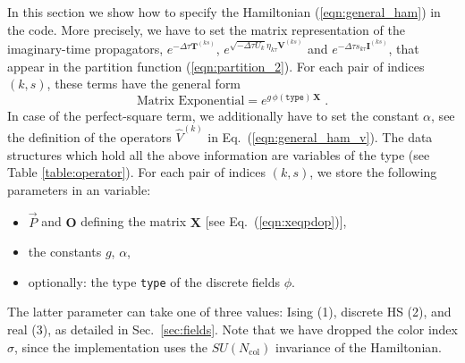 %
In this section we show how to specify the  Hamiltonian (\ref{eqn:general_ham}) in the code. 
More precisely, we have to set the matrix representation of the imaginary-time propagators,
$ e^{-\Delta \tau {\bm T}^{(ks)}}$, $e^{  \sqrt{- \Delta \tau  U_k} \eta_{k\tau} {\bm V}^{(ks)} }$ and $e^{  -\Delta \tau s_{k\tau}  {\bm I}^{(ks)}}$, that appear in the 
partition function (\ref{eqn:partition_2}).  For each pair of indices $(k,s)$, these terms have the general form
\begin{equation}\label{eqn:exponent_mat}
\text{Matrix Exponential}=
e^{g \,\phi(\texttt{type})\,\bm{X} }\;.
\end{equation}
In case of the  perfect-square term,  we additionally have to set the constant $\alpha$, see the definition of the operators $\hat{V}^{(k)}$ in Eq.~(\ref{eqn:general_ham_v}).
The data structures which hold all the above information are variables of the type  (see Table \ref{table:operator}). 
For each pair of indices $(k,s)$, we store the following parameters in an  variable:
\begin{itemize}
\item $\vec{P}$ and   $ \bm{O}$   defining the matrix $\bm{X}$ [see Eq.~(\ref{eqn:xeqpdop})],
\item the constants $g$, $\alpha$,
\item optionally: the type \texttt{type} of the discrete fields $\phi$.
\end{itemize}
The latter parameter can take one of three values: Ising (1), discrete HS (2), and real (3), as detailed in Sec.~\ref{sec:fields}.
Note that we have dropped the color index $\sigma$, since the implementation uses the $SU(N_{\mathrm{col}})$ invariance of the Hamiltonian. 

